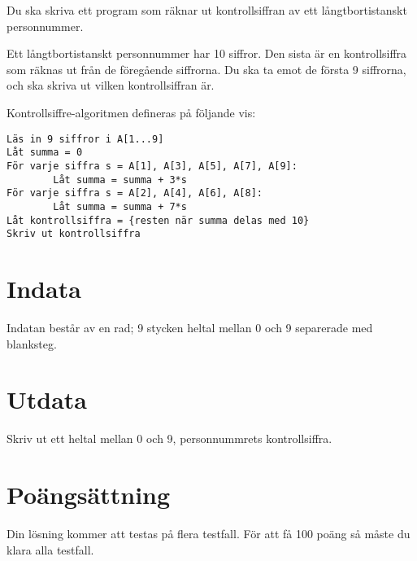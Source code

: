
Du ska skriva ett program som räknar ut kontrollsiffran av ett långtbortistanskt personnummer.

Ett långtbortistanskt personnummer har 10 siffror. Den sista är en kontrollsiffra som räknas ut från de föregående siffrorna. Du ska ta emot de första 9 siffrorna, och ska skriva ut vilken kontrollsiffran är.

Kontrollsiffre-algoritmen defineras på följande vis:

\begin{verbatim}
Läs in 9 siffror i A[1...9]
Låt summa = 0
För varje siffra s = A[1], A[3], A[5], A[7], A[9]:
        Låt summa = summa + 3*s
För varje siffra s = A[2], A[4], A[6], A[8]:
        Låt summa = summa + 7*s
Låt kontrollsiffra = {resten när summa delas med 10}
Skriv ut kontrollsiffra
\end{verbatim}

\section*{Indata}
Indatan består av en rad; 9 stycken heltal mellan 0 och 9 separerade med blanksteg.

\section*{Utdata}
Skriv ut ett heltal mellan 0 och 9, personnummrets kontrollsiffra.

\section*{Poängsättning}
Din lösning kommer att testas på flera testfall. För att få 100 poäng så måste du klara alla testfall.
